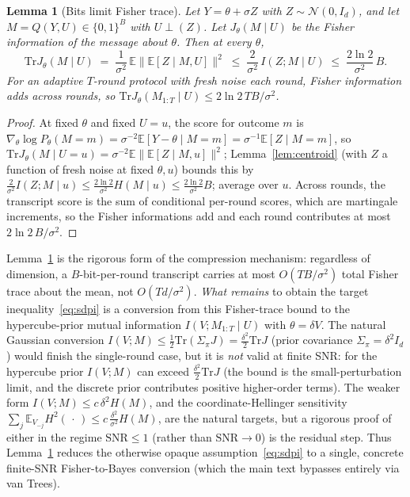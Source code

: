 \documentclass[11pt]{article}
\newtheorem{lemma}{Lemma}
\theoremstyle{definition}
\newcommand{\E}{\mathbb{E}}
\newcommand{\Tr}{\mathrm{Tr}}
\newcommand{\Ncal}{\mathcal{N}}
\begin{document}
\begin{lemma}[Bits limit Fisher trace]
\label{lem:fishertrace}
Let $Y=\theta+\sigma Z$ with $Z\sim\Ncal(0,I_d)$, and let $M=Q(Y,U)\in\{0,1\}^B$ with $U\perp(Z)$. Let
$J_\theta(M\mid U)$ be the Fisher information of the message about $\theta$. Then at every $\theta$,
\[
  \Tr J_\theta(M\mid U)\;=\;\frac{1}{\sigma^2}\,\E\big\|\E[Z\mid M,U]\big\|^2\;\le\;\frac{2}{\sigma^2}\,I(Z;M\mid U)\;\le\;\frac{2\ln2}{\sigma^2}\,B .
\]
For an adaptive $T$-round protocol with fresh noise each round, Fisher information adds across rounds, so
$\Tr J_\theta(M_{1:T}\mid U)\le 2\ln2\,TB/\sigma^2$.
\end{lemma}

\begin{proof}
At fixed $\theta$ and fixed $U=u$, the score for outcome $m$ is
$\nabla_\theta\log P_\theta(M=m)=\sigma^{-2}\E[Y-\theta\mid M=m]=\sigma^{-1}\E[Z\mid M=m]$, so
$\Tr J_\theta(M\mid U{=}u)=\sigma^{-2}\E\|\E[Z\mid M,u]\|^2$; Lemma~\ref{lem:centroid} (with $Z$ a function
of fresh noise at fixed $\theta,u$) bounds this by $\tfrac{2}{\sigma^2}I(Z;M\mid u)\le\tfrac{2\ln2}{\sigma^2}H(M\mid u)\le\tfrac{2\ln2}{\sigma^2}B$;
average over $u$. Across rounds, the transcript score is the sum of conditional per-round scores, which
are martingale increments, so the Fisher informations add and each round contributes at most
$2\ln2\,B/\sigma^2$.
\end{proof}

\noindent Lemma~\ref{lem:fishertrace} is the rigorous form of the compression mechanism: regardless of
dimension, a $B$-bit-per-round transcript carries at most $O(TB/\sigma^2)$ total Fisher trace about the
mean, not $O(Td/\sigma^2)$. \emph{What remains} to obtain the target inequality~\eqref{eq:sdpi} is a conversion from
this Fisher-trace bound to the hypercube-prior mutual information $I(V;M_{1:T}\mid U)$ with $\theta=\delta V$.
The natural Gaussian conversion $I(V;M)\le\tfrac12\Tr(\Sigma_\pi J)=\tfrac{\delta^2}{2}\Tr J$ (prior
covariance $\Sigma_\pi=\delta^2 I_d$) would finish the single-round case, but it is \emph{not} valid at
finite SNR: for the hypercube prior $I(V;M)$ can exceed $\tfrac{\delta^2}{2}\Tr J$ (the bound is the
small-perturbation limit, and the discrete prior contributes positive higher-order terms). The weaker
form $I(V;M)\le c\,\delta^2 H(M)$, and the coordinate-Hellinger sensitivity
$\sum_j\E_{V_{-j}}H^2(\,\cdot\,)\le c\,\tfrac{\delta^2}{\sigma^2}H(M)$, are the natural targets, but a rigorous
proof of either in the regime $\mathrm{SNR}\le1$ (rather than $\mathrm{SNR}\to0$) is the residual step. Thus Lemma~\ref{lem:fishertrace} reduces the otherwise opaque assumption~\eqref{eq:sdpi} to a single,
concrete finite-SNR Fisher-to-Bayes conversion (which the main text bypasses entirely via van Trees).
\end{document}
